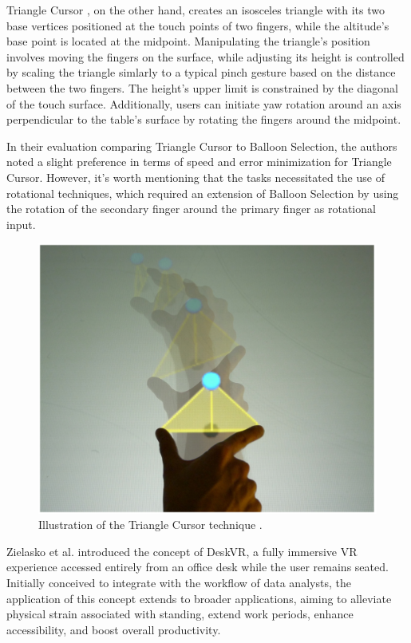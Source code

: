     Triangle Cursor \cite{strothoffTriangleCursorInteractions2011}, on the other hand, creates an isosceles triangle with its two base vertices positioned at the touch points of two fingers, while the altitude's base point is located at the midpoint. Manipulating the triangle's position involves moving the fingers on the surface, while adjusting its height is controlled by scaling the triangle simlarly to a typical pinch gesture based on the distance between the two fingers. The height's upper limit is constrained by the diagonal of the touch surface. Additionally, users can initiate yaw rotation around an axis perpendicular to the table's surface by rotating the fingers around the midpoint.

    In their evaluation comparing Triangle Cursor to Balloon Selection, the authors noted a slight preference in terms of speed and error minimization for Triangle Cursor. However, it's worth mentioning that the tasks necessitated the use of rotational techniques, which required an extension of Balloon Selection by using the rotation of the secondary finger around the primary finger as rotational input.

    \begin{figure}[ht!]
        \centering
        \includegraphics[width=0.6\linewidth]{figures/triangle_cursor.png}
        \caption{Illustration of the Triangle Cursor technique \cite{strothoffTriangleCursorInteractions2011}.}
        \label{fig:sota_triangle}
    \end{figure}


   Zielasko et al. \cite{zielaskoRemainSeatedFullyimmersive2017} introduced the concept of DeskVR, a fully immersive VR experience accessed entirely from an office desk while the user remains seated. Initially conceived to integrate with the workflow of data analysts, the application of this concept extends to broader applications, aiming to alleviate physical strain associated with standing, extend work periods, enhance accessibility, and boost overall productivity.

